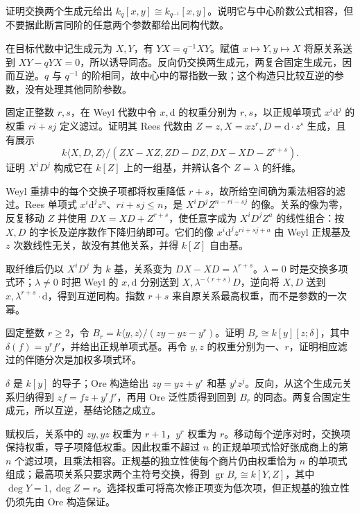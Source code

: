 \begin{optionalexercise}\label{b2:ex:20-quantum-inverse-parameter}
	证明交换两个生成元给出 \(k_q[x,y]\cong k_{q^{-1}}[x,y]\)。说明它与中心阶数公式相容，但不要据此断言同阶的任意两个参数都给出同构代数。
\end{optionalexercise}
\begin{solution}
	在目标代数中记生成元为 \(X,Y\)，有 \(YX=q^{-1}XY\)。赋值 \(x\mapsto Y,y\mapsto X\) 将原关系送到 \(XY-qYX=0\)，所以诱导同态。反向仍交换两生成元，两复合固定生成元，因而互逆。\(q\) 与 \(q^{-1}\) 的阶相同，故中心中的幂指数一致；这个构造只比较互逆的参数，没有处理其他同阶参数。
\end{solution}

\begin{optionalexercise}\label{b2:ex:20-weyl-rees-fibres}
	固定正整数 \(r,s\)，在 Weyl 代数中令 \(x,\mathrm d\) 的权重分别为 \(r,s\)，以正规单项式 \(x^i\mathrm d^j\) 的权重 \(ri+sj\) 定义滤过。证明其 Rees 代数由 \(Z=z,X=xz^r,D=\mathrm d\cdot z^s\) 生成，且有展示
	\[
		k\langle X,D,Z\rangle/(ZX-XZ,ZD-DZ,DX-XD-Z^{r+s}).
	\]
	证明 \(X^iD^j\) 构成它在 \(k[Z]\) 上的一组基，并辨认各个 \(Z=\lambda\) 的纤维。
\end{optionalexercise}
\begin{solution}
	Weyl 重排中的每个交换子项都将权重降低 \(r+s\)，故所给空间确为乘法相容的滤过。Rees 单项式 \(x^i\mathrm d^jz^n\)、\(ri+sj\le n\)，是 \(X^iD^jZ^{n-ri-sj}\) 的像。关系的像为零，反复移动 \(Z\) 并使用 \(DX=XD+Z^{r+s}\)，使任意字成为 \(X^iD^jZ^a\) 的线性组合：按 \(X,D\) 的字长及逆序数作下降归纳即可。它们的像 \(x^i\mathrm d^jz^{ri+sj+a}\) 由 Weyl 正规基及 \(z\) 次数线性无关，故没有其他关系，并得 \(k[Z]\) 自由基。

	取纤维后仍以 \(X^iD^j\) 为 \(k\) 基，关系变为 \(DX-XD=\lambda^{r+s}\)。\(\lambda=0\) 时是交换多项式环；\(\lambda\ne0\) 时把 Weyl 的 \(x,\mathrm d\) 分别送到 \(X,\lambda^{-(r+s)}D\)，逆向将 \(X,D\) 送到 \(x,\lambda^{r+s}\cdot\mathrm d\)，得到互逆同构。指数 \(r+s\) 来自原关系最高权重，而不是参数的一次幂。
\end{solution}

\begin{optionalexercise}\label{b2:ex:20-bad-pbw-quotient}
	固定整数 \(r\ge2\)，令 \(B_r=k\langle y,z\rangle/(zy-yz-y^r)\)。证明 \(B_r\cong k[y][z;\delta]\)，其中 \(\delta(f)=y^rf'\)，并给出正规单项式基。再令 \(y,z\) 的权重分别为一、\(r\)，证明相应滤过的伴随分次是加权多项式环。
\end{optionalexercise}
\begin{solution}
	\(\delta\) 是 \(k[y]\) 的导子；Ore 构造给出 \(zy=yz+y^r\) 和基 \(y^iz^j\)。反向，从这个生成元关系归纳得到 \(zf=fz+y^rf'\)，再用 Ore 泛性质得到回到 \(B_r\) 的同态。两复合固定生成元，所以互逆，基结论随之成立。

	赋权后，关系中的 \(zy,yz\) 权重为 \(r+1\)，\(y^r\) 权重为 \(r\)。移动每个逆序对时，交换项保持权重，导子项降低权重。因此权重不超过 \(n\) 的正规单项式恰好张成商上的第 \(n\) 个滤过项，且乘法相容。正规基的独立性使每个商片仍由权重恰为 \(n\) 的单项式组成；最高项关系只要求两个主符号交换，得到 \(\operatorname{gr}B_r\cong k[Y,Z]\)，其中 \(\deg Y=1,\deg Z=r\)。选择权重可将高次修正项变为低次项，但正规基的独立性仍须先由 Ore 构造保证。
\end{solution}

